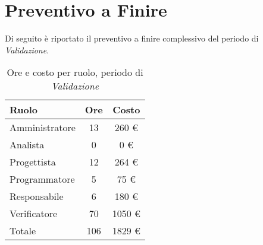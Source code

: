 \section{Preventivo a Finire}
Di seguito è riportato il preventivo a finire complessivo del periodo di \textit{Validazione}.

\begin{table}[H]
	\centering
	\begin{tabular}{ l c c }
		\textbf{Ruolo} & \textbf{Ore} & \textbf{Costo} \\
		\hline
		Amministratore & 13 & 260 \euro{} \\
		Analista & 0 & 0 \euro{} \\
		Progettista & 12 & 264 \euro{} \\
		Programmatore & 5 & 75 \euro{} \\
		Responsabile & 6 & 180 \euro{} \\
		Verificatore & 70 & 1050 \euro{} \\
		\hline
		Totale & 106 & 1829 \euro{} \\
		\hline
	\end{tabular}
	\caption{Ore e costo per ruolo, periodo di \textit{Validazione}}
\end{table}

\newpage